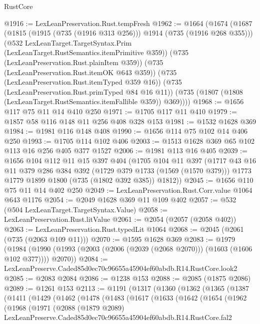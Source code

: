 \begin{lexlean}{RustCore}
\begin{coremodule}
@1916 := LexLeanPreservation.Rust.tempFresh
@1962 := @1664
    (@1674
      (@1687
        (@1815 (@1915 (@735 (@1916 @313 @256))) @1914 (@735 (@1916 @268 @355)))
        (@532 LexLeanTarget.TargetSyntax.Prim (LexLeanTarget.RustSemantics.itemPrimitive @359))
        (@735 (LexLeanPreservation.Rust.plainItem @359))
        (@735 (LexLeanPreservation.Rust.itemOK @643 @359))
        (@735 (LexLeanPreservation.Rust.itemTyped @359 @16))
        (@735 (LexLeanPreservation.Rust.primTyped @84 @16 @11))
        (@735 (@1807 (@1808 (LexLeanTarget.RustSemantics.itemFallible @359)) @369))))
@1968 := @1656 @117 @75 @11 @14 @410 @250
@1971 := @1705 @117 @11 @410
@1979 := @1857 @58 @116 @148 @11 @256 @408 @328 @153
@1981 := @1532 @1628 @369
@1984 := @1981 @116 @148 @408
@1990 := @1656 @114 @75 @102 @14 @406 @250
@1993 := @1705 @114 @102 @406
@2003 := @1513 @1628 @369 @65 @102 @113 @16 @256 @405 @377 @1527
@2006 := @1981 @113 @16 @405
@2039 := @1656
    @104
    @112
    @11
    @15
    @397
    @404
    (@1705
      @104
      @11
      @397
      (@1717
        @43
        @16
        @11
        @379
        @286
        @384
        @392
        (@1729 @379 @1733 (@1569 (@1570 @379)))
        @1773
        @1779
        @1899
        @1800
        (@735 (@1802 @392 @385))
        @1812))
@2045 := @1656 @110 @75 @11 @14 @402 @250
@2049 := LexLeanPreservation.Rust.Corr.value @1064 @643 @1176
@2054 := @2049 @1628 @369 @11 @109 @402
@2057 := @532 (@504 LexLeanTarget.TargetSyntax.Value)
@2058 := LexLeanPreservation.Rust.litValue
@2061 := @2054 (@2057 (@2058 @402))
@2063 := LexLeanPreservation.Rust.typedLit @1064
@2068 := @2045 (@2061 (@735 (@2063 @109 @11)))
@2070 := @1595 @1628 @369
@2083 := @1979
    (@1984 (@1990 (@1993 (@2003 (@2006 (@2039 (@2068 @2070))) (@1603 (@1606 @102 @377)))) @2070))
@2084 := LexLeanPreserve.Caded85d0ec70c96655a45904ef60abdb.R14.RustCore.look2
@2085 := @2083 @2084
@2086 := @1238 @153
@2088 := @2085 (@1875 @2086)
@2089 := @1261 @153
@2113 := @1191
    (@1317
      (@1360
        (@1362
          (@1365
            (@1387
              (@1411
                (@1429
                  (@1462
                    (@1478
                      (@1483
                        (@1617
                          (@1633
                            (@1642
                              (@1654
                                (@1962
                                  (@1968
                                    (@1971
                                      (@2088
                                        (@1879 @2089)
                                        LexLeanPreserve.Caded85d0ec70c96655a45904ef60abdb.R14.RustCore.fal2

\end{coremodule}
\end{lexlean}
